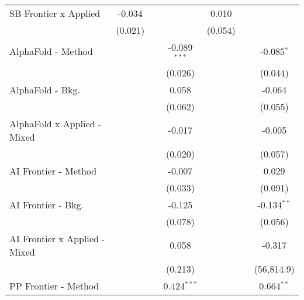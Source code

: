\begin{tabular}{lcccccc}
   SB Frontier x Applied                       & -0.034         &                &                & 0.010          &              &   \\   
                                               & (0.021)        &                &                & (0.054)        &              &   \\   
   AlphaFold - Method                          &                &                & -0.089$^{***}$ &                &              & -0.085$^{*}$\\   
                                               &                &                & (0.026)        &                &              & (0.044)\\   
   AlphaFold - Bkg.                            &                &                & 0.058          &                &              & -0.064\\   
                                               &                &                & (0.062)        &                &              & (0.055)\\   
   AlphaFold x Applied - Mixed                 &                &                & -0.017         &                &              & -0.005\\   
                                               &                &                & (0.020)        &                &              & (0.057)\\   
   AI Frontier - Method                        &                &                & -0.007         &                &              & 0.029\\   
                                               &                &                & (0.033)        &                &              & (0.091)\\   
   AI Frontier - Bkg.                          &                &                & -0.125         &                &              & -0.134$^{**}$\\   
                                               &                &                & (0.078)        &                &              & (0.056)\\   
   AI Frontier x Applied - Mixed               &                &                & 0.058          &                &              & -0.317\\   
                                               &                &                & (0.213)        &                &              & (56,814.9)\\   
   PP Frontier - Method                        &                &                & 0.424$^{***}$  &                &              & 0.664$^{**}$\\   

\end{tabular}
